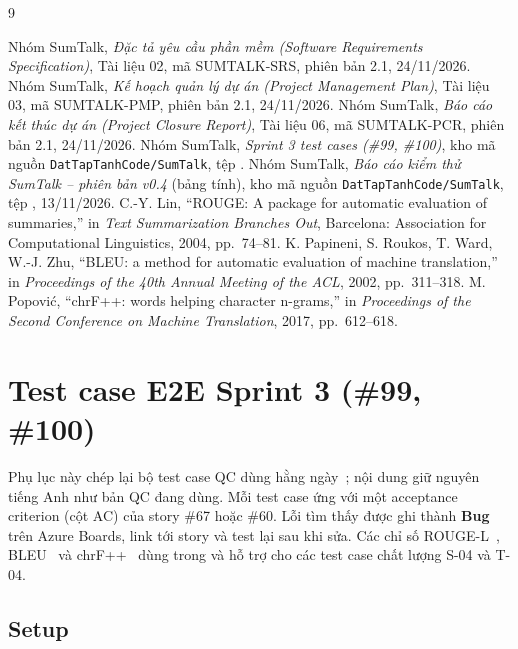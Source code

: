 \documentclass[12pt,a4paper]{report}
\begin{document}
\begin{thebibliography}{9}
   Nhóm SumTalk, \emph{Đặc tả yêu cầu phần mềm (Software Requirements Specification)},
    Tài liệu 02, mã SUMTALK-SRS, phiên bản 2.1, 24/11/2026.
   Nhóm SumTalk, \emph{Kế hoạch quản lý dự án (Project Management Plan)}, Tài liệu 03,
    mã SUMTALK-PMP, phiên bản 2.1, 24/11/2026.
   Nhóm SumTalk, \emph{Báo cáo kết thúc dự án (Project Closure Report)}, Tài liệu 06,
    mã SUMTALK-PCR, phiên bản 2.1, 24/11/2026.
   Nhóm SumTalk, \emph{Sprint 3 test cases (\#99, \#100)}, kho mã nguồn
    \texttt{DatTapTanhCode/SumTalk}, tệp .
   Nhóm SumTalk, \emph{Báo cáo kiểm thử SumTalk -- phiên bản v0.4} (bảng tính), kho mã nguồn
    \texttt{DatTapTanhCode/SumTalk}, tệp , 13/11/2026.
   C.-Y. Lin, ``ROUGE: A package for automatic evaluation of summaries,'' in \emph{Text
    Summarization Branches Out}, Barcelona: Association for Computational Linguistics, 2004, pp.~74--81.
   K. Papineni, S. Roukos, T. Ward, W.-J. Zhu, ``BLEU: a method for automatic evaluation of machine
    translation,'' in \emph{Proceedings of the 40th Annual Meeting of the ACL}, 2002, pp.~311--318.
   M. Popović, ``chrF++: words helping character n-grams,'' in \emph{Proceedings of the Second
    Conference on Machine Translation}, 2017, pp.~612--618.
\end{thebibliography}

\appendix
\chapter{Test case E2E Sprint 3 (\#99, \#100)}
\label{app:testcases}

Phụ lục này chép lại bộ test case QC dùng hằng ngày~\cite{testcases}; nội dung giữ nguyên tiếng Anh như bản QC
đang dùng. Mỗi test case ứng với một acceptance criterion (cột AC) của story \#67 hoặc \#60. Lỗi tìm thấy được ghi
thành \textbf{Bug} trên Azure Boards, link tới story và test lại sau khi sửa. Các chỉ số ROUGE-L~\cite{rouge},
BLEU~\cite{bleu} và chrF++~\cite{chrf} dùng trong  và  hỗ trợ cho
các test case chất lượng S-04 và T-04.

\section{Setup}
\end{document}
